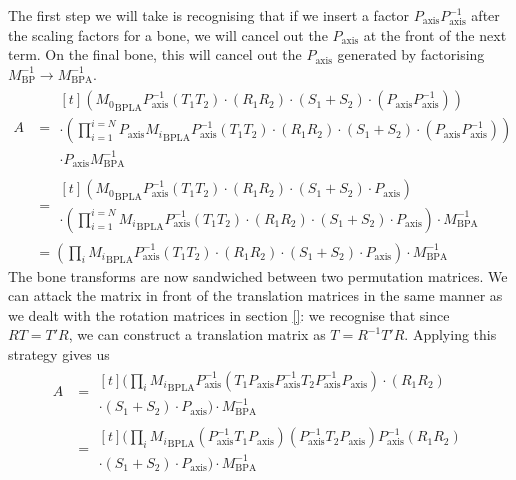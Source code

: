\documentclass{article}
\begin{document}
The first step we will take is recognising that if we insert a factor $P_\mathrm{axis}P_\mathrm{axis}^{-1}$ after the scaling factors for a bone, we will cancel out the $P_\mathrm{axis}$ at the front of the next term. On the final bone, this will cancel out the $P_\mathrm{axis}$ generated by factorising $M^{-1}_\mathrm{BP} \to M^{-1}_\mathrm{BPA}$.
\begin{align}
A &= \!\begin{multlined}[t] \left( {M_0}_\mathrm{BPLA} P_\mathrm{axis}^{-1} \left(T_1 T_2\right) \cdot \left(R_1 R_2\right) \cdot \left(S_1 + S_2\right) \cdot \left(P_\mathrm{axis}P_\mathrm{axis}^{-1}\right)\right)\\
 \cdot \left( \prod_{i=1}^{i=N}  P_\mathrm{axis} {M_i}_\mathrm{BPLA}  P_\mathrm{axis}^{-1} \left(T_1 T_2\right) \cdot \left(R_1 R_2\right) \cdot \left(S_1 + S_2\right) \cdot \left(P_\mathrm{axis}P_\mathrm{axis}^{-1}\right) \right)\\
 \cdot P_\mathrm{axis} M_\mathrm{BPA}^{-1}
\end{multlined}\\
&= \!\begin{multlined}[t] \left( {M_0}_\mathrm{BPLA} P_\mathrm{axis}^{-1} \left(T_1 T_2\right) \cdot \left(R_1 R_2\right) \cdot \left(S_1 + S_2\right) \cdot P_\mathrm{axis}\right)\\
 \cdot \left( \prod_{i=1}^{i=N} {M_i}_\mathrm{BPLA}  P_\mathrm{axis}^{-1} \left(T_1 T_2\right) \cdot \left(R_1 R_2\right) \cdot \left(S_1 + S_2\right) \cdot P_\mathrm{axis} \right) \cdot M_\mathrm{BPA}^{-1}
\end{multlined}\\
&= \left( \prod_{i} {M_i}_\mathrm{BPLA}  P_\mathrm{axis}^{-1} \left(T_1 T_2\right) \cdot \left(R_1 R_2\right) \cdot \left(S_1 + S_2\right) \cdot P_\mathrm{axis} \right) \cdot M_\mathrm{BPA}^{-1}
\end{align}
The bone transforms are now sandwiched between two permutation matrices. We can attack the matrix in front of the translation matrices in the same manner as we dealt with the rotation matrices in section \ref{}: we recognise that since $RT = T'R$, we can construct a translation matrix as $T=R^{-1}T'R$. Applying this strategy gives us
\begin{align}
A &= \begin{multlined}[t]
\Bigg( \prod_{i} {M_i}_\mathrm{BPLA}  P_\mathrm{axis}^{-1} \left(T_1 P_\mathrm{axis} P_\mathrm{axis}^{-1} T_2 P_\mathrm{axis}^{-1} P_\mathrm{axis} \right) \cdot \left(R_1 R_2\right) \\
\cdot \left(S_1 + S_2\right) \cdot P_\mathrm{axis} \Bigg) \cdot M_\mathrm{BPA}^{-1}
\end{multlined}\\
&= \begin{multlined}[t]
\Bigg( \prod_{i} {M_i}_\mathrm{BPLA}  \left(P_\mathrm{axis}^{-1} T_1 P_\mathrm{axis} \right)\left(P_\mathrm{axis}^{-1} T_2 P_\mathrm{axis} \right)  P_\mathrm{axis}^{-1} \left(R_1 R_2\right) \\
\cdot \left(S_1 + S_2\right) \cdot P_\mathrm{axis} \Bigg) \cdot M_\mathrm{BPA}^{-1}
\end{multlined}
\end{align}
\end{document}
